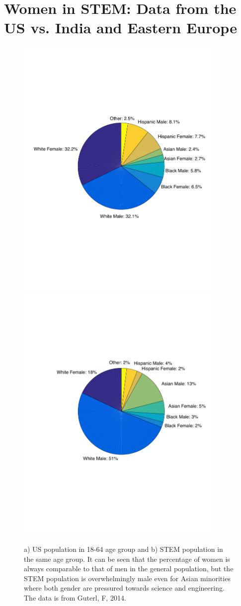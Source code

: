 \documentclass[utf8]{frontiersSCNS} %
\begin{document}
\section{Women in STEM: Data from the US vs. India and Eastern Europe}
\label{Sec4}

\begin{figure}%
  \centering
  \includegraphics[width=10cm]{PopulationPieChart.pdf}
  \includegraphics[width=10cm]{PieChartSTEM.pdf}
  \caption{a) US population in 18-64 age group and b) STEM population in the same age group. It can be seen that the percentage of women is always comparable to that of men in the general population, but the STEM population is overwhelmingly male even for Asian minorities where both gender are pressured towards science and engineering. The data is from Guterl, F, 2014.}
\label{fig:pie}
\end{figure}
\end{document}
